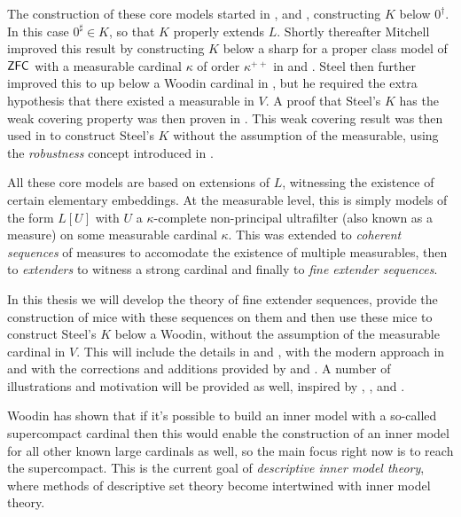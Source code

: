 \begin{onehalfspacing}
\quad The construction of these core models started in \cite{DJ1}, \cite{DJ2} and \cite{DJ3}, constructing $K$ below $0^\dagger$. In this case $0^\sharp\in K$, so that $K$ properly extends $L$. Shortly thereafter Mitchell improved this result by constructing $K$ below a sharp for a proper class model of $\operatorname{\mathsf{ZFC}}$ with a measurable cardinal $\kappa$ of order $\kappa^{++}$ in \cite{Mitchell1} and \cite{Mitchell2}. Steel then further improved this to up below a Woodin cardinal in \cite{CMIP}, but he required the extra hypothesis that there existed a measurable in $V$. A proof that Steel's $K$ has the weak covering property was then proven in \cite{WkCov}. This weak covering result was then used in \cite{Kwithoutmeasurable} to construct Steel's $K$ without the assumption of the measurable, using the \textit{robustness} concept introduced in \cite{RobustExtenders}.

\qquad All these core models are based on extensions of $L$, witnessing the existence of certain elementary embeddings. At the measurable level, this is simply models of the form $L[U]$ with $U$ a $\kappa$-complete non-principal ultrafilter (also known as a measure) on some measurable cardinal $\kappa$. This was extended to \textit{coherent sequences} of measures to accomodate the existence of multiple measurables, then to \textit{extenders} to witness a strong cardinal and finally to \textit{fine extender sequences}.

\qquad In this thesis we will develop the theory of fine extender sequences, provide the construction of mice with these sequences on them and then use these mice to construct Steel's $K$ below a Woodin, without the assumption of the measurable cardinal in $V$. This will include the details in \cite{FSIT} and \cite{CMIP}, with the modern approach in \cite{OIMT} and with the corrections and additions provided by \cite{Deconstructing} and \cite{Kwithoutmeasurable}. A number of illustrations and motivation will be provided as well, inspired by \cite{OIMT}, \cite{Lowe}, \cite{Godelsprogram} and \cite{Schimmerling}.

\quad Woodin has shown that if it's possible to build an inner model with a so-called supercompact cardinal then this would enable the construction of an inner model for all other known large cardinals as well, so the main focus right now is to reach the supercompact. This is the current goal of \textit{descriptive inner model theory}, where methods of descriptive set theory become intertwined with inner model theory. 

\end{onehalfspacing}
\setlength{\parindent}{0pt}
